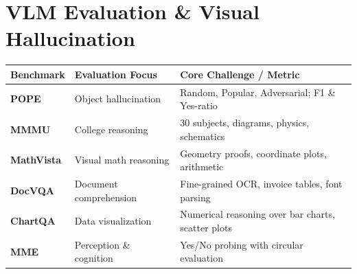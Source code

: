 \section{VLM Evaluation \& Visual Hallucination}\label{sec:vlm-eval}

\begin{mem}
\begin{tabularx}{\columnwidth}{@{}p{16mm} p{24mm} X@{}}
\toprule
\textbf{Benchmark} & \textbf{Evaluation Focus} & \textbf{Core Challenge / Metric} \\
\midrule
\textbf{POPE} & Object hallucination & Random, Popular, Adversarial; F1 \& Yes-ratio \\
\textbf{MMMU} & College reasoning & 30 subjects, diagrams, physics, schematics \\
\textbf{MathVista} & Visual math reasoning & Geometry proofs, coordinate plots, arithmetic \\
\textbf{DocVQA} & Document comprehension & Fine-grained OCR, invoice tables, font parsing \\
\textbf{ChartQA} & Data visualization & Numerical reasoning over bar charts, scatter plots \\
\textbf{MME} & Perception \& cognition & Yes/No probing with circular evaluation \\
\bottomrule
\end{tabularx}
\end{mem}

